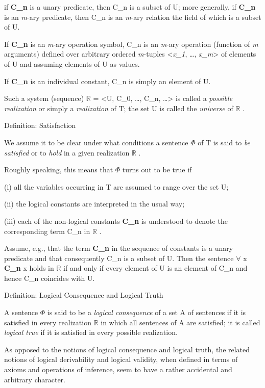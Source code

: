 if \textbf{C\_n} is a unary predicate, then C\_n is a subset of U; more
generally, if \textbf{C\_n} is an \emph{m}-ary predicate, then C\_n is
an \emph{m}-ary relation the field of which is a subset of U.

If \textbf{C\_n} is an \emph{m}-ary operation symbol, C\_n is an
\emph{m}-ary operation (function of \emph{m} arguments) defined over
arbitrary ordered \emph{m}-tuples \textless{}\emph{x\_1}, \ldots,
\emph{x\_m}\textgreater{} of elements of U and assuming elements of U as
values.

If \textbf{C\_n} is an individual constant, C\_n is simply an element of
U.

Such a system (sequence) $\mathbb{R}$  = \textless U, C\_0, \ldots, C\_n,
\ldots\textgreater{} is called a \emph{possible realization} or simply a
\emph{realization} of T; the set U is called the \emph{universe} of $\mathbb{R}$ .

\protect\hypertarget{anchor-17}{}{}Definition: Satisfaction

We assume it to be clear under what conditions a sentence $\Phi$  of T is said
to \emph{be satisfied} or to \emph{hold} in a given realization $\mathbb{R}$ .

Roughly speaking, this means that $\Phi$  turns out to be true if

(i) all the variables occurring in T are assumed to range over the set
U;

(ii) the logical constants are interpreted in the usual way;

(iii) each of the non-logical constants \textbf{C\_n} is understood to
denote the corresponding term C\_n in $\mathbb{R}$ .

Assume, e.g., that the term \textbf{C\_n} in the sequence of constants
is a unary predicate and that consequently C\_n is a subset of U. Then
the sentence $\forall$ x \textbf{C\_n} x holds in $\mathbb{R}$  if and only if every element
of U is an element of C\_n and hence C\_n coincides with U.

\protect\hypertarget{anchor-18}{}{}Definition: Logical Consequence and
Logical Truth

A sentence $\Phi$  is said to be a \emph{logical consequence} of a set A of
sentences if it is satisfied in every realization $\mathbb{R}$  in which all
sentences of A are satisfied; it is called \emph{logical true} if it is
satisfied in every possible realization.

As opposed to the notions of logical consequence and logical truth, the
related notions of logical derivability and logical validity, when
defined in terms of axioms and operations of inference, seem to have a
rather accidental and arbitrary character.

